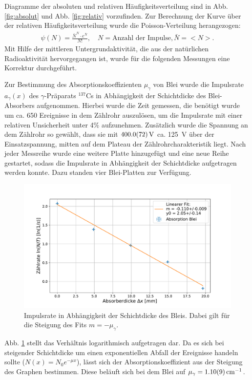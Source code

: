 	Diagramme der absoluten und relativen Häufigkeitsverteilung sind in Abb. \ref{fig:absolut} und Abb. \ref{fig:relativ} vorzufinden. 
	Zur Berechnung der Kurve über der relativen Häufigkeitsverteilung wurde die Poisson-Verteilung herangezogen: 
	\begin{align}
		\psi (N) = \frac{\bar{N}^N\cdot e^{\bar{N}}}{N!}, \quad N = \text{Anzahl der Impulse}, \bar{N} = <N>.
	\end{align} 
	Mit Hilfe der mittleren Untergrundaktivität, die aus der natürlichen Radioaktivität hervorgegangen ist, wurde für die folgenden Messungen eine Korrektur durchgeführt.
	
	Zur Bestimmung des Absorptionskoeffizienten $\mu_\gamma$ von Blei wurde die Impulsrate $a_\gamma (x)$ des $\gamma$-Präparats $^{137}$Cs in Abhängigkeit der Schichtdicke des Blei-Absorbers aufgenommen.	
	Hierbei wurde die Zeit gemessen, die benötigt wurde um ca. 650 Ereignisse in dem Zählrohr auszulösen, um die Impulsrate mit einer relativen Unsicherheit unter 4\% aufzunehmen.
	Zusätzlich wurde die Spannung an dem Zählrohr so gewählt, dass sie mit $\SI{400+-7,2}{\volt}$ ca. \SI{125}{\volt} über der Einsatzspannung, mitten auf dem Plateau der Zählrohrcharakteristik liegt.
	Nach jeder Messreihe wurde eine weitere Platte hinzugefügt und eine neue Reihe gestartet, sodass die Impulsrate in Abhängigkeit der Schichtdicke aufgetragen werden konnte.
	Dazu standen vier Blei-Platten zur Verfügung.
	\begin{figure}[ht]
		\centering
		\includegraphics[width=\textwidth]{data/GammaAbsorber.pdf}
		\caption{Impulsrate in Abhängigkeit der Schichtdicke des Bleis. Dabei gilt für die Steigung des Fits $m = -\mu_\gamma$.}
		\label{fig:gamma}	
	\end{figure}
	Abb. \ref{fig:gamma} stellt das Verhältnis logarithmisch aufgetragen dar. 
	Da es sich bei steigender Schichtdicke um einen exponentiellen Abfall der Ereignisse handeln sollte ($N(x) = N_0 e^{-\mu x}$), lässt sich der Absorptionskoeffizient aus der Steigung des Graphen bestimmen.
	Diese beläuft sich bei dem Blei auf $\mu_\gamma = \SI{1.10+-0.09}{\per\centi\meter}$.
	
